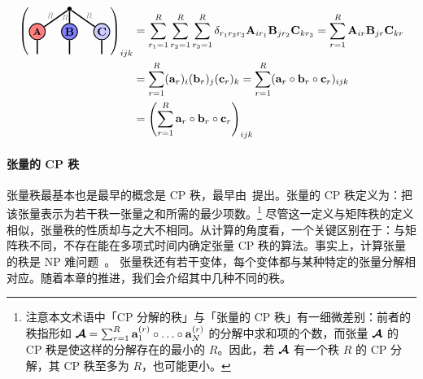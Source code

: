 \begin{align*}
    \left(\begin{tikzpicture}[baseline=\baseline]
    \tikzset{tensor/.style = {minimum size = 0.5cm,shape = circle,thick,draw=black,inner sep = 0pt}, edge/.style   = {thick,line width=.4mm},every loop/.style={}}
    \def\y{0}
    \def\x{0}
  \node[tensor,fill=red!50!white] (A) at (\x,\y){\scalebox{0.85}{$\Ab$}};
  \node[tensor,fill=blue!50!white] (B) at (\x+1,\y){$\Bb$};
   \node[tensor,fill=blue!20!white] (C) at (\x+2,\y){$\Cb$};
    \draw  node[fill = black,circle,inner sep=0pt,minimum size=4pt] (m) at (\x+1,\y+0.7) {};
    \draw[edge] (A) -- (m);
    \node[draw=none] () at (\x+0.4,\y+0.5) {\scalebox{0.7}{\dimcolor{$R$}}};
    \draw[edge] (B) -- (m) node [midway,left=-0.09cm] {\scalebox{0.7}{\dimcolor{$R$}}};
    \draw[edge] (C) -- (m);
    \node[draw=none] () at (\x+1.6,\y+0.5) {\scalebox{0.7}{\dimcolor{$R$}}};
    \draw[edge](A) -- (\x,\y-0.7);
    \draw[edge](B) -- (\x+1,\y-0.7);
    \draw[edge](C) -- (\x+2,\y-0.7);
\end{tikzpicture}\right)_{ijk} 
&= \sum_{r_1=1}^R\sum_{r_2=1}^R\sum_{r_3=1}^R\delta_{r_1r_2r_3}\Ab_{ir_1}\Bb_{jr_2}\Cb_{kr_3}
=
\sum_{r=1}^R\Ab_{ir}\Bb_{jr}\Cb_{kr}\\
&=
\sum_{r=1}^R(\ab_r)_i(\bb_r)_j(\cbb_r)_k 
=
\sum_{r=1}^R(\ab_r\outprod\bb_r\outprod\cbb_r)_{ijk}\\
&=
\left(\sum_{r=1}^R\ab_r\outprod\bb_r\outprod\cbb_r\right)_{ijk}
\end{align*}
\paragraph{张量的 CP 秩}
张量秩最基本也是最早的概念是 CP 秩，最早由~\citep{hitchcock1927expression}提出。张量的 CP 秩定义为：把该张量表示为若干秩一张量之和所需的最少项数。\footnote{注意本文术语中「CP 分解的秩」与「张量的 CP 秩」有一细微差别：前者的秩指形如 $\At = \sum_{r=1}^R \ab^{(r)}_1\outprod\dots\outprod\ab^{(r)}_N$ 的分解中求和项的个数，而张量 $\bm{\mathcal{A}}$ 的 CP 秩是使这样的分解存在的最小的 $R$。因此，若 $\bm{\mathcal{A}}$ 有一个秩 $R$ 的 CP 分解，其 CP 秩至多为 $R$，也可能更小。}
尽管这一定义与矩阵秩的定义相似，张量秩的性质却与之大不相同。从计算的角度看，一个关键区别在于：与矩阵秩不同，不存在能在多项式时间内确定张量 CP 秩的算法。事实上，计算张量的秩是 NP 难问题~\citep{hillar2013most}。
张量秩还有若干变体，每个变体都与某种特定的张量分解相对应。随着本章的推进，我们会介绍其中几种不同的秩。


